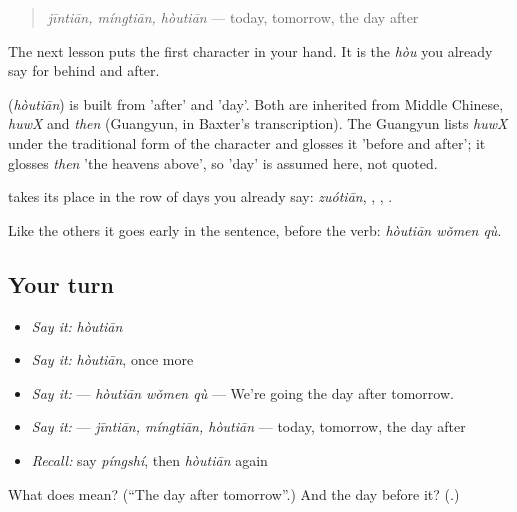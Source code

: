 \begin{quote}
\textbf{  } \emph{jīntiān, míngtiān, hòutiān} — today, tomorrow, the day after
\end{quote}

The next lesson puts the first character in your hand. It is the \emph{hòu} you already say for behind and after.

\begin{cousinweb}
\textbf{} (\emph{hòutiān}) is built from  'after' and  'day'. Both are inherited from Middle Chinese, \emph{huwX} and \emph{then} (Guangyun, in Baxter's transcription). The Guangyun lists \emph{huwX} under the traditional form of the character and glosses it 'before and after'; it glosses \emph{then} 'the heavens above', so 'day' is assumed here, not quoted.
\end{cousinweb}

\begin{grammarlens}[title={What you've built}]
 takes its place in the row of days you already say: \emph{zuótiān}, , , .

Like the others it goes early in the sentence, before the verb: \textbf{} \emph{hòutiān wǒmen qù}.
\end{grammarlens}

\subsection*{Your turn}
\begin{itemize}
\raggedright
  \item \emph{Say it:} \emph{hòutiān}
  \item \emph{Say it:} \emph{hòutiān}, once more
  \item \emph{Say it:}  — \emph{hòutiān wǒmen qù} — We're going the day after tomorrow.
  \item \emph{Say it:}    — \emph{jīntiān, míngtiān, hòutiān} — today, tomorrow, the day after
  \item \emph{Recall:} say \emph{píngshí}, then \emph{hòutiān} again
\end{itemize}

\begin{tcolorbox}[breakable,colback=teal!4,colframe=teal!35!black,title={Before you move on}]
What does  mean? (\textquotedblleft{}The day after tomorrow\textquotedblright{}.) And the day before it? (\textbf{}.)
\end{tcolorbox}
